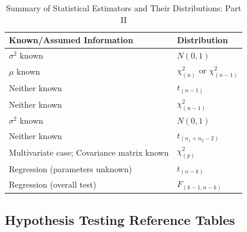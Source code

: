 \documentclass{article}
\begin{document}
\begin{table}[H]
\centering
\caption{Summary of Statistical Estimators and Their Distributions: Part II}
\label{tab:estimators_part2}
\renewcommand{\arraystretch}{1.3}
\begin{tabular}{@{}p{5cm} p{3.5cm}@{}}
\toprule
\textbf{Known/Assumed Information} & \textbf{Distribution} \\
\midrule
$\sigma^2$ known  & $N(0, 1)$ \\[5pt]
\midrule
$\mu$ known & $\chi^2_{(n)}$ or $\chi^2_{(n-1)}$ \\[5pt]
\midrule
Neither known  & $t_{(n-1)}$ \\[5pt]
\midrule
Neither known  & $\chi^2_{(n-1)}$ \\[5pt]
\midrule
$\sigma^2$ known  & $N(0, 1)$ \\[5pt]
\midrule
Neither known & $t_{(n_1+n_2-2)}$ \\[5pt]
\midrule
Multivariate case; Covariance matrix known & $\chi^2_{(p)}$ \\[5pt]
\midrule
Regression (parameters unknown) & $t_{(n-k)}$ \\[5pt]
\midrule
Regression (overall test) & $F_{(k-1, n-k)}$ \\
\bottomrule
\end{tabular}
\end{table}

\subsection{Hypothesis Testing Reference Tables}
\end{document}
